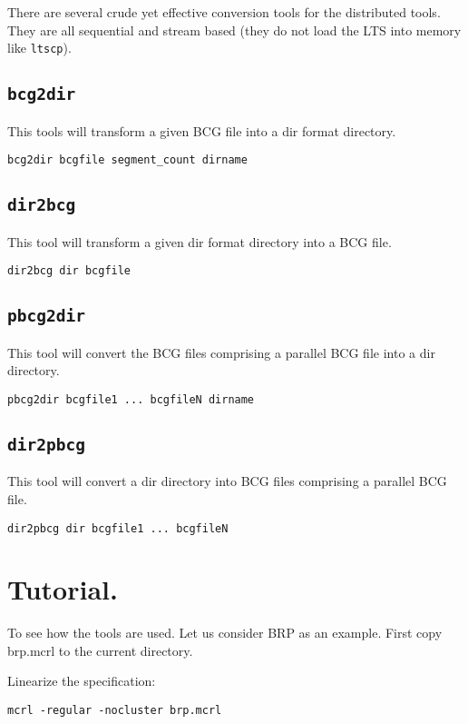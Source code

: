 \documentclass{cwiarticle}
\begin{document}
There are several crude yet effective conversion tools for the distributed tools.
They are all sequential and stream based (they do not load the LTS into memory like \verb+ltscp+).

\subsection*{\tt bcg2dir}

This tools will transform a given BCG file into a dir format directory.
\begin{verbatim}
bcg2dir bcgfile segment_count dirname
\end{verbatim}

\subsection*{\tt dir2bcg}

This tool will transform a given dir format directory into a BCG file.
\begin{verbatim}
dir2bcg dir bcgfile
\end{verbatim}

\subsection*{\tt pbcg2dir}

This tool will convert the BCG files comprising a parallel BCG file
into a dir directory.
\begin{verbatim}
pbcg2dir bcgfile1 ... bcgfileN dirname
\end{verbatim}

\subsection*{\tt dir2pbcg}

This tool will convert a dir directory into BCG files comprising a parallel BCG file.
\begin{verbatim}
dir2pbcg dir bcgfile1 ... bcgfileN
\end{verbatim}

\section{Tutorial.}

To see how the tools are used. Let us consider BRP as an example.
First copy brp.mcrl to the current directory.

Linearize the specification:
\begin{verbatim}
mcrl -regular -nocluster brp.mcrl
\end{verbatim}
\end{document}
